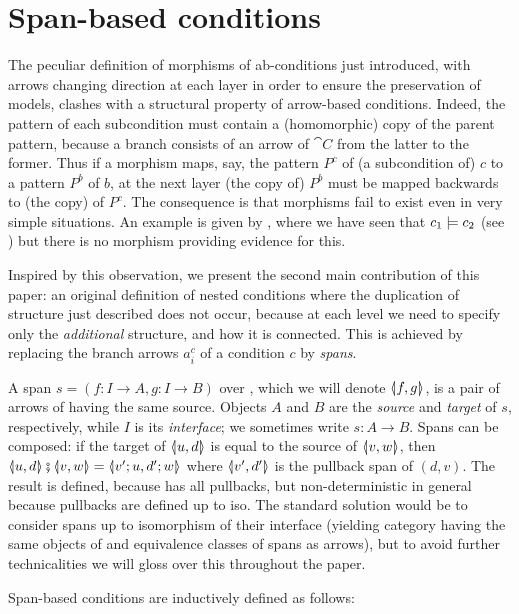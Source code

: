 \section{Span-based conditions}

The peculiar definition of morphisms of ab-conditions just introduced, with arrows changing direction at each layer in order to ensure the preservation of models, clashes with a structural property of arrow-based conditions. Indeed, the pattern of each subcondition must contain a (homomorphic) copy of the parent pattern, because a branch consists of an arrow of $\cat{C}$ from the latter to the former. Thus if a morphism maps, say, the pattern $P^c$ of (a subcondition of) $c$ to a pattern $P^b$ of $b$, at the next layer (the copy of) $P^b$ must be mapped backwards to (the copy) of $P^c$. The consequence is that morphisms fail to exist even in very simple situations. An example is given by , where we have seen that $c_1\models c_2$ (see ) but there is no morphism providing evidence for this.
  
Inspired by this observation, we present the second main contribution of this paper: an original definition of nested conditions where the duplication of structure just described does not occur, because at each level we need to specify only the \emph{additional} structure, and how it is connected. This is achieved by replacing the branch arrows $a^c_i$ of a condition $c$ by \emph{spans}.

A span $s = (f: I \to A, g:I \to B)$ over , which we will denote $\spanof f g$, is a pair of arrows of  having the same source. Objects $A$ and $B$ are the \emph{source} and \emph{target} of $s$, respectively, while $I$ is its \emph{interface}; we sometimes write $s:A\to B$. Spans can be composed: if the target of $\spanof u d$ is equal to the source of $\spanof v w$, then $\spanof u d \spcomp \spanof v w=\spanof{v';u}{d';w}$ where $\spanof {v'}{d'}$ is the pullback span of $(d,v)$. The result is defined, because  has all pullbacks, but non-deterministic in general because pullbacks are defined up to iso. The standard solution would be to consider spans up to isomorphism of their interface (yielding category {\SpanC} having the same objects of  and equivalence classes of spans as arrows), but to avoid further technicalities we will gloss over this throughout the paper.


\medskip\noindent
Span-based conditions are inductively defined as follows:

